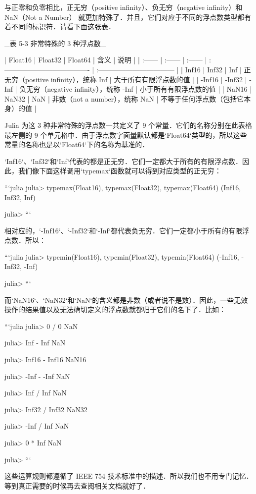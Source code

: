 与正零和负零相比，正无穷（positive infinity）、负无穷（negative infinity）和 NaN（Not a Number） 就更加特殊了．并且，它们对应于不同的浮点数类型都有着不同的标识符．请看下面这张表．

_表 5-3 非常特殊的 3 种浮点数_

| Float16 | Float32 | Float64 | 含义                                   | 说明                               |
| :------ | :------ | :------ | :------------------------------------- | :--------------------------------- |
| Inf16   | Inf32   | Inf     | 正无穷（positive infinity），统称 Inf  | 大于所有有限浮点数的值             |
| -Inf16  | -Inf32  | -Inf    | 负无穷（negative infinity），统称 -Inf | 小于所有有限浮点数的值             |
| NaN16   | NaN32   | NaN     | 非数（not a number），统称 NaN         | 不等于任何浮点数（包括它本身）的值 |

Julia 为这 3 种非常特殊的浮点数一共定义了 9 个常量．它们的名称分别在此表格最左侧的 9 个单元格中．由于浮点数字面量默认都是`Float64`类型的，所以这些常量的名称也是以`Float64`下的名称为基准的．

`Inf16`、`Inf32`和`Inf`代表的都是正无穷．它们一定都大于所有的有限浮点数．因此，我们像下面这样调用`typemax`函数就可以得到对应类型的正无穷：

```julia
julia> typemax(Float16), typemax(Float32), typemax(Float64)
(Inf16, Inf32, Inf)

julia> 
```

相对应的，`-Inf16`、`-Inf32`和`-Inf`都代表负无穷．它们一定都小于所有的有限浮点数．所以：

```julia
julia> typemin(Float16), typemin(Float32), typemin(Float64)
(-Inf16, -Inf32, -Inf)

julia> 
```

而`NaN16`、`NaN32`和`NaN`的含义都是非数（或者说不是数）．因此，一些无效操作的结果值以及无法确切定义的浮点数就都归于它们的名下了．比如：

```julia
julia> 0 / 0
NaN

julia> Inf - Inf
NaN

julia> Inf16 - Inf16
NaN16

julia> -Inf - -Inf
NaN

julia> Inf / Inf
NaN

julia> Inf32 / Inf32
NaN32

julia> -Inf / Inf
NaN

julia> 0 * Inf
NaN

julia> 
```

这些运算规则都遵循了 IEEE 754 技术标准中的描述．所以我们也不用专门记忆．等到真正需要的时候再去查阅相关文档就好了．

